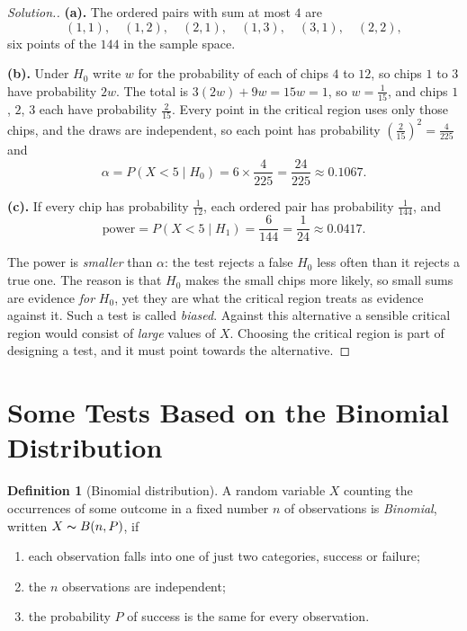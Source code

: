 \documentclass[11pt,a4paper]{article}
\theoremstyle{definition}
\newtheorem{definition}[thm]{Definition}
\newenvironment{solution}
  {\renewcommand{\qedsymbol}{}\begin{proof}[\textit{Solution}.]}
  {\end{proof}}
\begin{document}
\begin{solution}
\textbf{(a).} The ordered pairs with sum at most $4$ are
\[(1,1),\quad (1,2),\quad (2,1),\quad (1,3),\quad (3,1),\quad (2,2),\]
six points of the $144$ in the sample space.

\textbf{(b).} Under $H_0$ write $w$ for the probability of each of chips $4$ to $12$, so
chips $1$ to $3$ have probability $2w$. The total is $3(2w)+9w = 15w = 1$, so
$w = \frac{1}{15}$, and chips $1$, $2$, $3$ each have probability $\frac{2}{15}$. Every
point in the critical region uses only those chips, and the draws are independent, so
each point has probability $\left(\frac{2}{15}\right)^{2} = \frac{4}{225}$ and
\[\alpha = P(X<5\mid H_0) = 6\times\frac{4}{225} = \frac{24}{225}\approx 0.1067.\]

\textbf{(c).} If every chip has probability $\frac{1}{12}$, each ordered pair has
probability $\frac{1}{144}$, and
\[\text{power} = P(X<5\mid H_1) = \frac{6}{144} = \frac{1}{24}\approx 0.0417.\]

The power is \emph{smaller} than $\alpha$: the test rejects a false $H_0$ less often
than it rejects a true one. The reason is that $H_0$ makes the small chips more likely,
so small sums are evidence \emph{for} $H_0$, yet they are what the critical region
treats as evidence against it. Such a test is called \emph{biased}. Against this
alternative a sensible critical region would consist of \emph{large} values of $X$.
Choosing the critical region is part of designing a test, and it must point towards the
alternative.
\end{solution}


\section{Some Tests Based on the Binomial Distribution}

\begin{definition}[Binomial distribution]
A random variable $X$ counting the occurrences of some outcome in a fixed number
$n$ of observations is \emph{Binomial}, written $X\thicksim B(n,P)$, if
\begin{enumerate}
\item[*] each observation falls into one of just two categories, success or failure;
\item[*] the $n$ observations are independent;
\item[*] the probability $P$ of success is the same for every observation.
\end{enumerate}
\end{definition}
\end{document}
